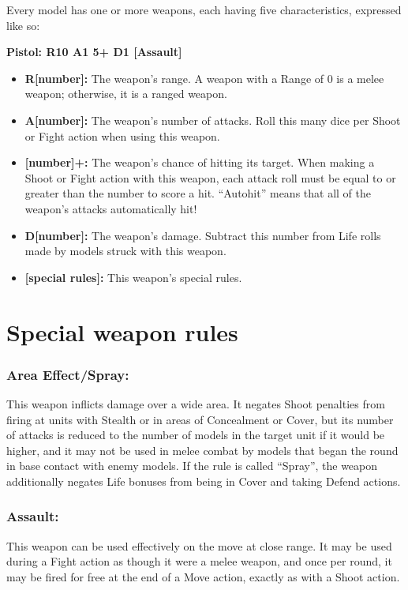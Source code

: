 \begin{multicols}{2}
Every model has one or more weapons, each having five characteristics, expressed like so:

\textbf{Pistol: R10 A1 5+ D1 [Assault]}

\begin{itemize}
    \item \textbf{R[number]:} The weapon's range. A weapon with a Range of 0 is a melee weapon; otherwise, it is a ranged weapon.
    \item \textbf{A[number]:} The weapon's number of attacks. Roll this many dice per Shoot or Fight action when using this weapon.
    \item \textbf{[number]+:} The weapon's chance of hitting its target. When making a Shoot or Fight action with this weapon, each attack roll must be equal to or greater than the number to score a hit. ``Autohit'' means that all of the weapon's attacks automatically hit!
    \item \textbf{D[number]:} The weapon's damage. Subtract this number from Life rolls made by models struck with this weapon.
    \item \textbf{[special rules]:} This weapon's special rules.
\end{itemize}




\section*{Special weapon rules}

\subsubsection*{Area Effect/Spray:} This weapon inflicts damage over a wide area. It negates Shoot penalties from firing at units with Stealth or in areas of Concealment or Cover, but its number of attacks is reduced to the number of models in the target unit if it would be higher, and it may not be used in melee combat by models that began the round in base contact with enemy models. If the rule is called ``Spray'', the weapon additionally negates Life bonuses from being in Cover and taking Defend actions.

\subsubsection*{Assault:} This weapon can be used effectively on the move at close range. It may be used during a Fight action as though it were a melee weapon, and once per round, it may be fired for free at the end of a Move action, exactly as with a Shoot action.


\end{multicols}
